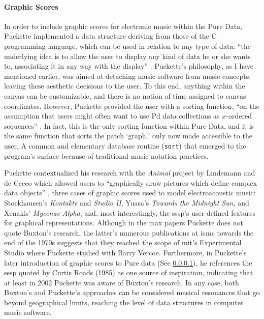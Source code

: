 \documentclass[
]{book}
\newcommand{\see}[1]{(See \ref{#1})}
\begin{document}
\paragraph{Graphic Scores}
\label{graphic_scores}
In order to include graphic scores for electronic music within the Pure Data, Puckette implemented a data structure deriving from those of the C programming language, which can be used in relation to any type of data: ``the underlying idea is to allow the user to display any kind of data he or she wants to, associating it in any way with the display'' \parencite[184]{DBLP:conf/icmc/Puckette02}. Puckette's philosophy, as I have mentioned earlier, was aimed at detaching music software from music concepts, leaving these aesthetic decisions to the user. To this end, anything within the canvas can be customizable, and there is no notion of time assigned to canvas coordinates. However, Puckette provided the user with a sorting function, ``on the assumption that users might often want to use Pd data collections as $x$-ordered sequences'' \parencite[185]{DBLP:conf/icmc/Puckette02}. In fact, this is the only sorting function within Pure Data, and it is the same function that sorts the patch `graph,' only now made accessible to the user. A common and elementary database routine (\texttt{sort}) that emerged to the program's surface because of traditional music notation practices.

Puckette contextualized his research with the \textit{Animal} project by Lindemann and de Cecco which allowed users to ``graphically draw pictures which define complex data objects'' \parencite{DBLP:conf/icmc/Lindemann90a}, three cases of graphic scores used to model electroacoustic music: Stockhausen's \textit{Kontakte} and \textit{Studio II}, Yuasa's \textit{Towards the Midnight Sun}, and Xenakis' \textit{Mycenae Alpha}, and, most interestingly, the \gls{sssp}'s user-defined features for graphical representations. Although in the \gls{max} papers Puckette does not quote Buxton's research, the latter's numerous publications at \gls{icmc} towards the end of the 1970s suggests that they reached the scope of \gls{mit}'s Experimental Studio where Puckette studied with Barry Vercoe. Furthermore, in Puckette's later introduction of graphic scores to Pure data \parencite{DBLP:conf/icmc/Puckette02} \see{graphic_scores}, he references the \gls{sssp} quoted by Curtis Roads (1985) as one source of inspiration, indicating that at least in 2002 Puckette was aware of Buxton's research. In any case, both Buxton's and Puckette's approaches can be considered musical resonances that go beyond geographical limits, reaching the level of data structures in computer music software.
\end{document}

